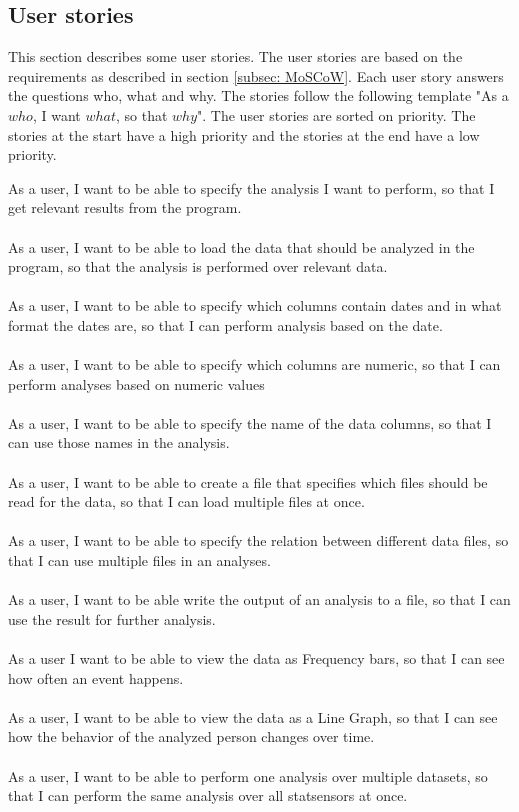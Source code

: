\subsection{User stories}
\label{subsec:User-stories}
This section describes some user stories. The user stories are based on the requirements as described in section \ref{subsec: MoSCoW}. Each user story answers the questions who, what and why. The stories follow the following template "As a $who$, I want $what$, so that $why$". The user stories are sorted on priority. The stories at the start have a high priority and the stories at the end have a low priority.

As a user, I want to be able to specify the analysis I want to perform, so that I get relevant results from the program. 
\\\\
As a user, I want to be able to load the data that should be analyzed in the program, so that the analysis is performed over relevant data. 
\\\\
As a user, I want to be able to specify which columns contain dates and in what format the dates are, so that I can perform analysis based on the date.
\\\\
As a user, I want to be able to specify which columns are numeric, so that I can perform analyses based on numeric values
\\\\
As a user, I want to be able to specify the name of the data columns, so that I can use those names in the analysis.
\\\\
As a user, I want to be able to create a file that specifies which files should be read for the data, so that I can load multiple files at once.
\\\\
As a user, I want to be able to specify the relation between different data files, so that I can use multiple files in an analyses.
\\\\
As a user, I want to be able write the output of an analysis to a file, so that I can use the result for further analysis.
\\\\
As a user I want to be able to view the data as Frequency bars, so that I can see how often an event happens.
\\\\
As a user, I want to be able to view the data as a Line Graph, so that I can see how the behavior of the analyzed person changes over time.
\\\\
As a user, I want to be able to perform one analysis over multiple datasets, so that I can perform the same analysis over all statsensors at once.
